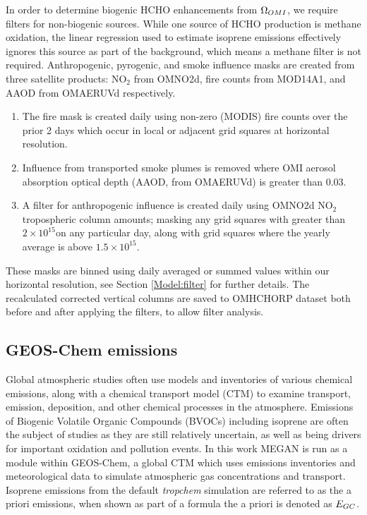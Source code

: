     In order to determine biogenic HCHO enhancements from $\Omega_{OMI}$, we require filters for non-biogenic sources.
    While one source of HCHO production is methane oxidation, the linear regression used to estimate isoprene emissions effectively ignores this source as part of the background, which means a methane filter is not required.
    Anthropogenic, pyrogenic, and smoke influence masks are created from three satellite products: NO$_2$ from OMNO2d, fire counts from MOD14A1, and AAOD from OMAERUVd respectively.
    \begin{enumerate}
      \item 
      The fire mask is created daily using non-zero (MODIS) fire counts over the prior 2 days which occur in local or adjacent grid squares at \highhr horizontal resolution.
      \item 
      Influence from transported smoke plumes is removed where OMI aerosol absorption optical depth (AAOD, from OMAERUVd) is greater than 0.03.
      \item 
      A filter for anthropogenic influence is created daily using OMNO2d NO$_2$ tropospheric column amounts; masking any grid squares with greater than $2\times 10^{15}$\moleccm on any particular day, along with grid squares where the yearly average is above $1.5 \times 10^{15}$\moleccm.
    \end{enumerate}
    These masks are binned using daily averaged or summed values within our \highhr horizontal resolution, see Section \ref{Model:filter} for further details.
    The recalculated corrected vertical columns are saved to OMHCHORP dataset both before and after applying the filters, to allow filter analysis.
    
    
  \subsection{GEOS-Chem emissions}
  
    Global atmospheric studies often use models and inventories of various chemical emissions, along with a chemical transport model (CTM) to examine transport, emission, deposition, and other chemical processes in the atmosphere.
    Emissions of Biogenic Volatile Organic Compounds (BVOCs) including isoprene are often the subject of studies as they are still relatively uncertain, as well as being drivers for important oxidation and pollution events.
    In this work MEGAN is run as a module within GEOS-Chem, a global CTM which uses emissions inventories and meteorological data to simulate atmospheric gas concentrations and transport.
    Isoprene emissions from the default \textit{tropchem} simulation are referred to as the a priori emissions, when shown as part of a formula the a priori is denoted as $E_{GC}$.
    
